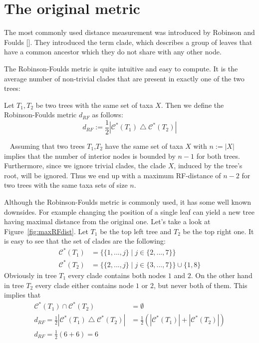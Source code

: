 \section{The original metric}
The most commonly used distance measurement was introduced by Robinson and Foulds []. They introduced the term clade, which describes a group of leaves that have a common ancestor which they do not share with any other node.

The Robinson-Foulds metric is quite intuitive and easy to compute. It is the average number of non-trivial clades that are present in exactly one of the two trees:
\begin{defin}
Let $T_1,T_2$ be two trees with the same set of taxa $X$. Then we define the Robinson-Foulds metric $d_{RF}$ as follows:
\[ d_{RF} := \frac{1}{2}|\mathcal{C}^*(T_1) \bigtriangleup \mathcal{C}^*(T_2)| \]
\end{defin}
\begin{rem}~\label{rem:n-2clades}
Assuming that two trees $T_1$,$T_2$ have the same set of taxa $X$ with $n:= |X|$ implies that the number of interior nodes is bounded by $n-1$ for both trees. Furthermore, since we ignore trivial clades, the clade $X$, induced by the tree's root, will be ignored. Thus we end up with a maximum RF-distance of $n-2$ for two trees with the same taxa sets of size $n$.
\end{rem}
Although the Robinson-Foulds metric is commonly used, it has some well known downsides. For example changing the position of a single leaf can yield a new tree having maximal distance from the original one. Let's take a look at Figure~\ref{fig:maxRFdist}. Let $T_1$ be the top left tree and $T_2$ be the top right one. It is easy to see that the set of clades are the following:
\begin{align*}
\mathcal{C}^*(T_1) &=\{ \{1,...,j\}\;|\;j\in \{2,...,7\}\} \\
\mathcal{C}^*(T_2) &=\{ \{2,...,j\}\;|\;j\in \{3,...,7\}\} \cup \{1,8\}
\end{align*}
Obviously in tree $T_1$ every clade contains both nodes $1$ and $2$. On the other hand in tree $T_2$ every clade either contains node $1$ or $2$, but never both of them. This implies that 
\begin{align*}
\mathcal{C}^*(T_1) \cap \mathcal{C}^*(T_2) &= \emptyset \\
d_{RF} = \frac{1}{2}|\mathcal{C}^*(T_1) \bigtriangleup \mathcal{C}^*(T_2)| &= \frac{1}{2}(|\mathcal{C}^*(T_1)| + |\mathcal{C}^*(T_2)|) \\
d_{RF} = \frac{1}{2}(6 + 6) = 6
\end{align*}
